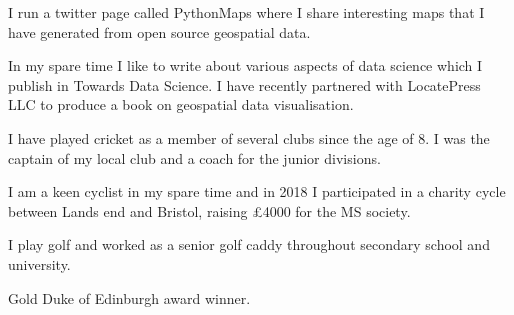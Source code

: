 \begin{cventries}
  \cventry
    {}
    {}
    {}
    {}
    {
      \begin{cvitems}
        \item {I run a twitter page called PythonMaps where I share interesting maps that I have generated from open source geospatial data.} 
        \item {In my spare time I like to write about various aspects of data science which I publish in Towards Data Science. I have recently partnered with LocatePress LLC to produce a book on geospatial data visualisation.}
        \item {I have played cricket as a member of several clubs since the age of 8. I was the captain of my local club and a coach for the junior divisions.}
        \item {I am a keen cyclist in my spare time and in 2018 I participated in a charity cycle between Lands end and Bristol, raising £4000 for the MS society.}
        \item {I play golf and worked as a senior golf caddy throughout secondary school and university.}
        \item {Gold Duke of Edinburgh award winner.}
      \end{cvitems}
    }
\end{cventries}
